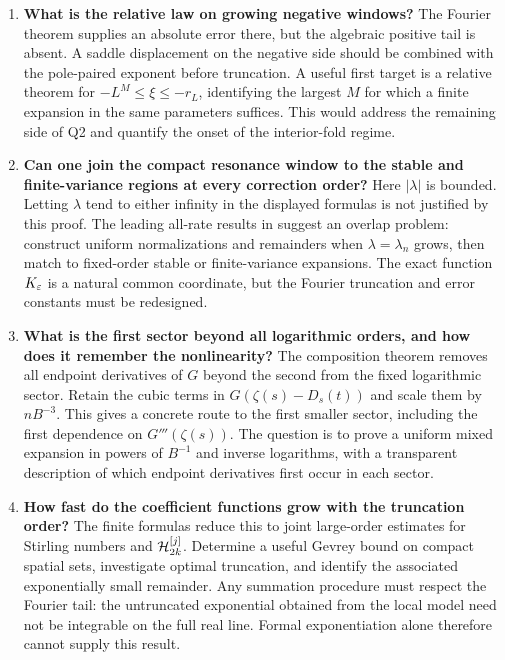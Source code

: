 \begin{enumerate}[label=\textbf{R\arabic*.},leftmargin=*]
\item \textbf{What is the relative law on growing negative
windows?} The Fourier theorem supplies an absolute error there,
but the algebraic positive tail is absent. A saddle displacement
on the negative side should be combined with the pole-paired
exponent before truncation. A useful first target is a relative
theorem for $-L^M\le\xi\le-r_L$, identifying the largest $M$
for which a finite expansion in the same parameters suffices.
This would address the remaining side of Q2 and quantify the
onset of the interior-fold regime.

\item \textbf{Can one join the compact resonance window to the
stable and finite-variance regions at every correction order?}
Here $|\lambda|$ is bounded. Letting $\lambda$ tend to either
infinity in the displayed formulas is not justified by this
proof. The leading all-rate results in \cite{repo-confluent}
suggest an overlap problem: construct uniform normalizations
and remainders when $\lambda=\lambda_n$ grows, then match to
fixed-order stable or finite-variance expansions. The exact
function $K_\varepsilon$ is a natural common coordinate, but the
Fourier truncation and error constants must be redesigned.

\item \textbf{What is the first sector beyond all logarithmic
orders, and how does it remember the nonlinearity?}
The composition theorem removes all endpoint derivatives of
$G$ beyond the second from the fixed logarithmic sector.
Retain the cubic terms in
$G(\zeta(s)-D_s(t))$ and scale them by $nB^{-3}$.
This gives a concrete route to the first smaller sector,
including the first dependence on $G'''(\zeta(s))$.
The question is to prove a uniform mixed expansion in powers
of $B^{-1}$ and inverse logarithms, with a transparent
description of which endpoint derivatives first occur in
each sector.

\item \textbf{How fast do the coefficient functions grow with
the truncation order?} The finite formulas reduce this to
joint large-order estimates for Stirling numbers and
$\mathcal H_{2k}^{[j]}$. Determine a useful Gevrey bound on compact
spatial sets, investigate optimal truncation, and identify the
associated exponentially small remainder. Any summation
procedure must respect the Fourier tail: the untruncated
exponential obtained from the local model need not be
integrable on the full real line. Formal exponentiation
alone therefore cannot supply this result.


\end{enumerate}
